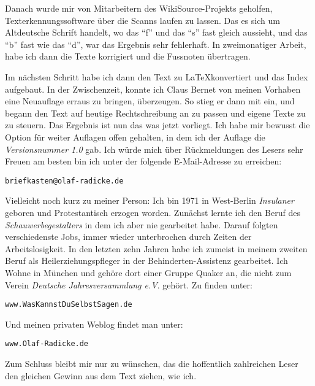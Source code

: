 Danach wurde mir von Mitarbeitern des WikiSource-Projekts geholfen,
Texterkennungssoftware über die Scanns laufen zu lassen. Das es sich um
Altdeutsche Schrift handelt, wo das "`f"' und das "`s"' fast gleich aussieht,
und das "`b"' fast wie das "`d"', war das Ergebnis sehr fehlerhaft. In
zweimonatiger Arbeit, habe ich dann die Texte korrigiert und die Fussnoten
übertragen.

\medskip

Im nächsten Schritt habe ich dann den Text zu \LaTeX konvertiert und das Index
aufgebaut. In der Zwischenzeit, konnte ich Claus Bernet von meinen Vorhaben eine
Neuauflage erraus zu bringen, überzeugen. So stieg er dann mit ein, und begann
den Text auf heutige Rechtschreibung an zu passen und eigene Texte zu zu
steuern. Das Ergebnis ist nun das was jetzt vorliegt. Ich habe mir bewusst die
Option für weiter Auflagen offen gehalten, in dem ich der Auflage die
\textit{Versionsnummer 1.0} gab. Ich würde mich über Rückmeldungen des Lesers
sehr Freuen am besten bin ich unter der folgende E-Mail-Adresse zu erreichen:

\begin{center}
\texttt{briefkasten@olaf-radicke.de}
\end{center}

Vielleicht noch kurz zu meiner Person: Ich bin 1971 in West-Berlin
\textit{Insulaner} geboren und Protestantisch erzogen worden. Zunächst lernte
ich den Beruf des \textit{Schauwerbegestalters} in dem ich aber nie gearbeitet
habe. Darauf folgten verschiedenste Jobs, immer wieder unterbrochen durch Zeiten
der Arbeitslosigkeit. In den letzten zehn Jahren habe ich zumeist in meinem
zweiten Beruf als Heilerziehungspfleger in der Behinderten-Assistenz gearbeitet.
Ich Wohne in München und gehöre dort einer Gruppe Quaker an, die nicht zum
Verein \textit{Deutsche Jahresversammlung e.V}. gehört. Zu finden unter:

\begin{center}
\texttt{www.WasKannstDuSelbstSagen.de}
\end{center}

Und meinen privaten Weblog findet man unter:

\begin{center}
\texttt{www.Olaf-Radicke.de}
\end{center}

Zum Schluss bleibt mir nur zu wünschen, das die hoffentlich zahlreichen Leser
den gleichen Gewinn aus dem Text ziehen, wie ich.



